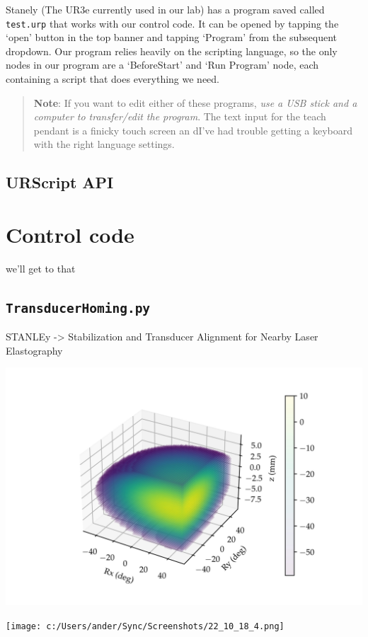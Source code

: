 \documentclass[11pt]{article}
\begin{document}
Stanely (The UR3e currently used in our lab) has a program saved called \texttt{test.urp} that works with our control code.
It can be opened by tapping the `open' button in the top banner and tapping `Program' from the subsequent dropdown. 
Our program relies heavily on the scripting language, so the only nodes in our program are a `BeforeStart' and `Run Program' node, each containing a script that does everything we need.
\begin{quote}
\textbf{Note}: If you want to edit either of these programs, \textit{use a USB stick and a computer to transfer/edit the program}. The text input for the teach pendant is a finicky touch screen an dI've had trouble getting a keyboard with the right language settings.
\end{quote}

\subsection{URScript API}\label{sec:urscript}

\section{Control code}\label{sec:control_code}
we'll get to that
\subsection{\texttt{TransducerHoming.py}}\label{sec:TransducerHoming}

STANLEy -> Stabilization and Transducer Alignment for Nearby Laser Elastography
\begin{center}
    \includegraphics[width=.9\linewidth]{../Debugging Scripts/figures/fullscan_render_test_4.jpg}
\end{center}

\begin{center}
    \texttt{[image: c:/Users/ander/Sync/Screenshots/22\_10\_18\_4.png]}
\end{center}
\end{document}
